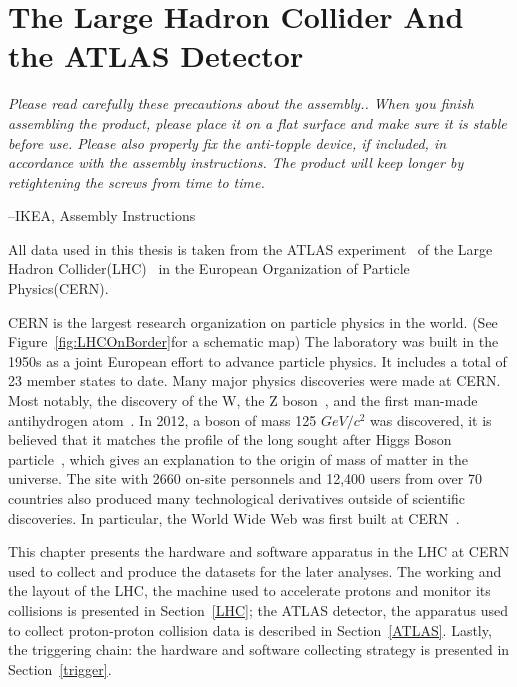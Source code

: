 \chapter{The Large Hadron Collider And the ATLAS Detector}
\label{chapter:ATLAS}

\epigraph{\textit{Please read carefully these precautions about the assembly.. When you finish assembling the product, please place it on a flat surface and make sure it is stable before use. Please also properly fix the anti-topple device, if included, in accordance with the assembly instructions. The product will keep longer by retightening the screws from time to time.}} {--IKEA, Assembly Instructions}

All data used in this thesis is taken from the ATLAS experiment~\cite{ATLAS:1999vwa} of the Large Hadron Collider(LHC)~\cite{Bruning:782076} in the European Organization of Particle Physics(CERN).

CERN is the largest research organization on particle physics in the world. (See Figure~\ref{fig:LHCOnBorder}for a schematic map) The laboratory was built in the 1950s as a joint European effort to advance particle physics. It includes a total of 23 member states to date. Many major physics discoveries were made at CERN. Most notably, the discovery of the W, the Z boson~\cite{hioki1982does}, and the first man-made antihydrogen atom~\cite{hioki1982does}. In 2012, a boson of mass 125
$\textit{GeV}/\textit{c}^{2}$ was discovered, it is believed that it matches the
profile of the long sought after Higgs Boson particle~\cite{chatrchyan2012observation}, which gives an explanation to the origin of mass of matter in the universe. The site with 2660 on-site personnels and 12,400 users from over 70 countries also produced many technological derivatives outside of scientific discoveries. In particular, the World Wide Web was first built at CERN~\cite{berners1994world}.

This chapter presents the hardware and software apparatus in the LHC at CERN used to collect and produce the datasets for the later analyses.
The working and the layout of the LHC, the machine used to accelerate protons and monitor its collisions is presented in Section~\ref{LHC}; the ATLAS detector, the apparatus used to collect proton-proton collision data is described in Section~\ref{ATLAS}. Lastly, the triggering chain: the hardware and software collecting strategy is presented in Section~\ref{trigger}.

